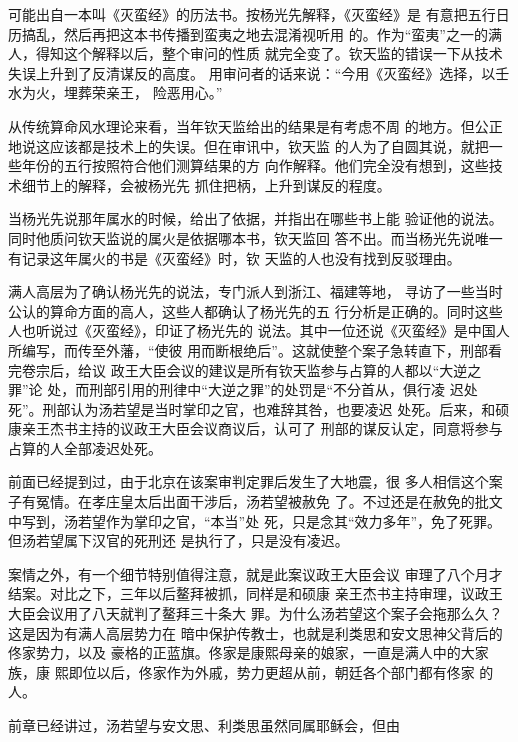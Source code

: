 可能出自一本叫《灭蛮经》的历法书。按杨光先解释，《灭蛮经》是%
有意把五行日历搞乱，然后再把这本书传播到蛮夷之地去混淆视听用%
的。作为“蛮夷”之一的满人，得知这个解释以后，整个审问的性质%
就完全变了。钦天监的错误一下从技术失误上升到了反清谋反的高度。%
用审问者的话来说：“今用《灭蛮经》选择，以壬水为火，埋葬荣亲王，%
险恶用心。”%
\par
从传统算命风水理论来看，当年钦天监给出的结果是有考虑不周%
的地方。但公正地说这应该都是技术上的失误。但在审讯中，钦天监%
的人为了自圆其说，就把一些年份的五行按照符合他们测算结果的方%
向作解释。他们完全没有想到，这些技术细节上的解释，会被杨光先%
抓住把柄，上升到谋反的程度。%
\par
当杨光先说那年属水的时候，给出了依据，并指出在哪些书上能%
验证他的说法。同时他质问钦天监说的属火是依据哪本书，钦天监回%
答不出。而当杨光先说唯一有记录这年属火的书是《灭蛮经》时，钦%
天监的人也没有找到反驳理由。%
\par
满人高层为了确认杨光先的说法，专门派人到浙江、福建等地，%
寻访了一些当时公认的算命方面的高人，这些人都确认了杨光先的五%
行分析是正确的。同时这些人也听说过《灭蛮经》，印证了杨光先的%
说法。其中一位还说《灭蛮经》是中国人所编写，而传至外藩，“使彼%
用而断根绝后”。这就使整个案子急转直下，刑部看完卷宗后，给议%
政王大臣会议的建议是所有钦天监参与占算的人都以“大逆之罪”论%
处，而刑部引用的刑律中“大逆之罪”的处罚是“不分首从，俱行凌%
迟处死”。刑部认为汤若望是当时掌印之官，也难辞其咎，也要凌迟%
处死。后来，和硕康亲王杰书主持的议政王大臣会议商议后，认可了%
刑部的谋反认定，同意将参与占算的人全部凌迟处死。%
\par
前面已经提到过，由于北京在该案审判定罪后发生了大地震，很%
多人相信这个案子有冤情。在孝庄皇太后出面干涉后，汤若望被赦免%
了。不过还是在赦免的批文中写到，汤若望作为掌印之官，“本当”处%
死，只是念其“效力多年”，免了死罪。但汤若望属下汉官的死刑还%
是执行了，只是没有凌迟。%
\par
案情之外，有一个细节特别值得注意，就是此案议政王大臣会议%
审理了八个月才结案。对比之下，三年以后鳌拜被抓，同样是和硕康%
亲王杰书主持审理，议政王大臣会议用了八天就判了鳌拜三十条大%
罪。为什么汤若望这个案子会拖那么久？这是因为有满人高层势力在%
暗中保护传教士，也就是利类思和安文思神父背后的佟家势力，以及%
豪格的正蓝旗。佟家是康熙母亲的娘家，一直是满人中的大家族，康%
熙即位以后，佟家作为外戚，势力更超从前，朝廷各个部门都有佟家%
的人。%
\par
前章已经讲过，汤若望与安文思、利类思虽然同属耶稣会，但由%
